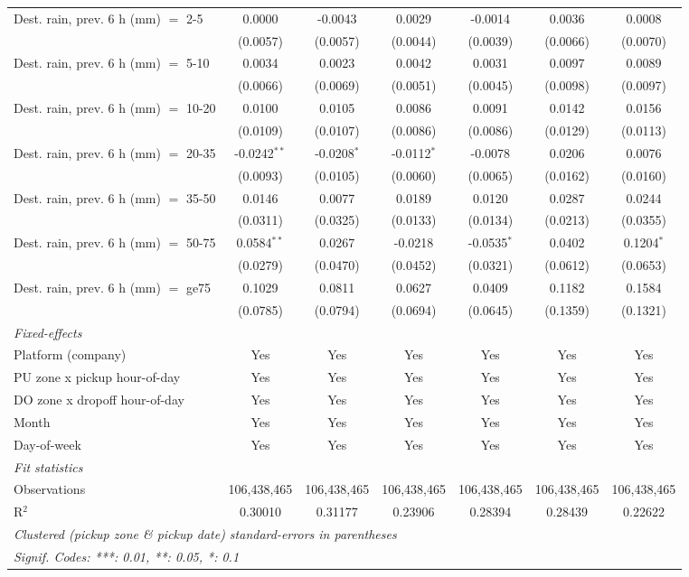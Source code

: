\begin{tabular}{lcccccc}
   Dest. rain, prev. 6 h (mm) $=$ 2-5 & 0.0000 & -0.0043 & 0.0029 & -0.0014 & 0.0036 & 0.0008\\
    & (0.0057) & (0.0057) & (0.0044) & (0.0039) & (0.0066) & (0.0070)\\
   Dest. rain, prev. 6 h (mm) $=$ 5-10 & 0.0034 & 0.0023 & 0.0042 & 0.0031 & 0.0097 & 0.0089\\
    & (0.0066) & (0.0069) & (0.0051) & (0.0045) & (0.0098) & (0.0097)\\
   Dest. rain, prev. 6 h (mm) $=$ 10-20 & 0.0100 & 0.0105 & 0.0086 & 0.0091 & 0.0142 & 0.0156\\
    & (0.0109) & (0.0107) & (0.0086) & (0.0086) & (0.0129) & (0.0113)\\
   Dest. rain, prev. 6 h (mm) $=$ 20-35 & -0.0242$^{**}$ & -0.0208$^{*}$ & -0.0112$^{*}$ & -0.0078 & 0.0206 & 0.0076\\
    & (0.0093) & (0.0105) & (0.0060) & (0.0065) & (0.0162) & (0.0160)\\
   Dest. rain, prev. 6 h (mm) $=$ 35-50 & 0.0146 & 0.0077 & 0.0189 & 0.0120 & 0.0287 & 0.0244\\
    & (0.0311) & (0.0325) & (0.0133) & (0.0134) & (0.0213) & (0.0355)\\
   Dest. rain, prev. 6 h (mm) $=$ 50-75 & 0.0584$^{**}$ & 0.0267 & -0.0218 & -0.0535$^{*}$ & 0.0402 & 0.1204$^{*}$\\
    & (0.0279) & (0.0470) & (0.0452) & (0.0321) & (0.0612) & (0.0653)\\
   Dest. rain, prev. 6 h (mm) $=$ ge75 & 0.1029 & 0.0811 & 0.0627 & 0.0409 & 0.1182 & 0.1584\\
    & (0.0785) & (0.0794) & (0.0694) & (0.0645) & (0.1359) & (0.1321)\\
   \midrule
   \emph{Fixed-effects}\\
   Platform (company) & Yes & Yes & Yes & Yes & Yes & Yes\\
   PU zone x pickup hour-of-day & Yes & Yes & Yes & Yes & Yes & Yes\\
   DO zone x dropoff hour-of-day & Yes & Yes & Yes & Yes & Yes & Yes\\
   Month & Yes & Yes & Yes & Yes & Yes & Yes\\
   Day-of-week & Yes & Yes & Yes & Yes & Yes & Yes\\
   \midrule
   \emph{Fit statistics}\\
   Observations & 106,438,465 & 106,438,465 & 106,438,465 & 106,438,465 & 106,438,465 & 106,438,465\\
   R$^2$ & 0.30010 & 0.31177 & 0.23906 & 0.28394 & 0.28439 & 0.22622\\
   \midrule \midrule
   \multicolumn{7}{l}{\emph{Clustered (pickup zone \& pickup date) standard-errors in parentheses}}\\
   \multicolumn{7}{l}{\emph{Signif. Codes: ***: 0.01, **: 0.05, *: 0.1}}\\
\end{tabular}
 
